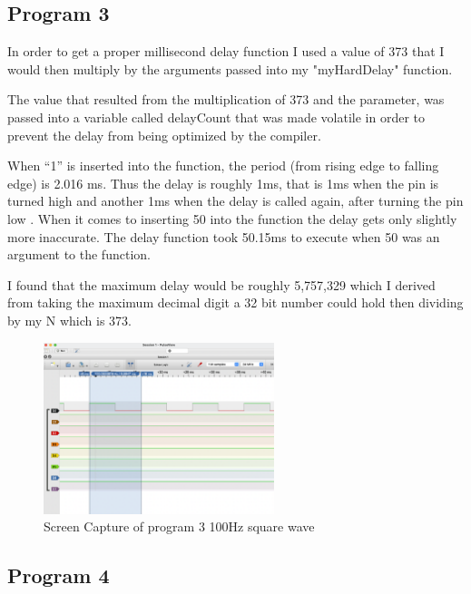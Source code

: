 \documentclass[11pt,pdftex,portrait,letterpaper]{article}
\begin{document}
\pagebreak

\subsection{Program 3}

In order to get a proper millisecond delay function I used a value of 373 that I would then multiply by the arguments passed into my "myHardDelay" function.

The value that resulted from the multiplication of 373 and the parameter, was passed into a variable called delayCount that was made volatile in order to prevent the delay from being optimized by the compiler.

When “1” is inserted into the function, the period (from rising edge to falling edge) is 2.016 ms. Thus the delay is roughly 1ms, that is 1ms when the pin is turned high and another 1ms when the delay is called again, after turning the pin low . When it comes to inserting 50 into the function the delay gets only slightly more inaccurate. The delay function took 50.15ms to execute when 50 was an argument to the function.

I found that the maximum delay would be roughly 5,757,329 which I derived from taking the maximum decimal digit a 32 bit number could hold then dividing by my N which is 373.
\begin{figure}[h]
	\centering
	\includegraphics[width=0.6\textwidth]{./PG3_logicAnalyzer}	%
	\caption{Screen Capture of program 3 100Hz square wave}
	\label{f:fig1}	%
\end{figure}
\pagebreak


\subsection{Program 4}
\end{document}
